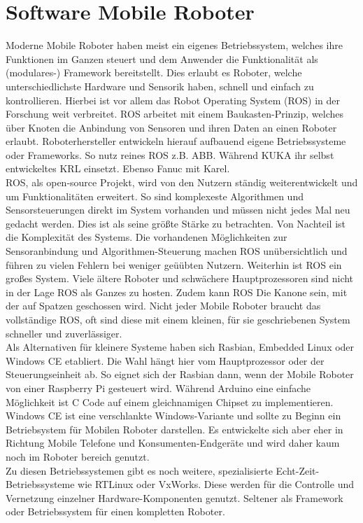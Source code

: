 \documentclass[a4paper,cleardoubleempty,BCOR1cm]{book}
\begin{document}
\section{Software Mobile Roboter}
Moderne Mobile Roboter haben meist ein eigenes Betriebssystem, welches ihre Funktionen im Ganzen steuert und dem Anwender die Funktionalität als (modulares-) Framework bereitstellt. Dies erlaubt es Roboter, welche unterschiedlichste Hardware und Sensorik haben, schnell und einfach zu kontrollieren. Hierbei ist vor allem das Robot Operating System (ROS) in der Forschung weit verbreitet. ROS arbeitet mit einem Baukasten-Prinzip, welches über Knoten die Anbindung von Sensoren und ihren Daten an einen Roboter erlaubt. Roboterhersteller entwickeln hierauf aufbauend eigene Betriebssysteme oder Frameworks. So nutz reines ROS z.B. ABB. Während KUKA ihr selbst entwickeltes KRL einsetzt. Ebenso Fanuc mit Karel. \\
ROS, als open-source Projekt, wird von den Nutzern ständig weiterentwickelt und um Funktionalitäten erweitert. So sind komplexeste Algorithmen und Sensorsteuerungen direkt im System vorhanden und müssen nicht jedes Mal neu gedacht werden. Dies ist als seine größte Stärke zu betrachten. Von Nachteil ist die Komplexität des Systems. Die vorhandenen Möglichkeiten zur Sensoranbindung und Algorithmen-Steuerung machen ROS unübersichtlich und führen zu vielen Fehlern bei weniger geüübten Nutzern. Weiterhin ist ROS ein großes System. Viele ältere Roboter und schwächere Hauptprozessoren sind nicht in der Lage ROS als Ganzes zu hosten. Zudem kann ROS Die Kanone sein, mit der auf Spatzen geschossen wird. Nicht jeder Mobile Roboter braucht das vollständige ROS, oft sind diese mit einem kleinen, für sie geschriebenen System schneller und zuverlässiger. \\
Als Alternativen für kleinere Systeme haben sich Rasbian, Embedded Linux oder Windows CE etabliert. Die Wahl hängt hier vom Hauptprozessor oder der Steuerungseinheit ab. So eignet sich der Rasbian dann, wenn der Mobile Roboter von einer Raspberry Pi gesteuert wird. Während Arduino eine einfache Möglichkeit ist C Code auf einem gleichnamigen Chipset zu implementieren. Windows CE ist eine verschlankte Windows-Variante und sollte zu Beginn ein Betriebsystem für Mobilen Roboter darstellen. Es entwickelte sich aber eher in Richtung Mobile Telefone und Konsumenten-Endgeräte und wird daher kaum noch im Roboter bereich genutzt. \\
Zu diesen Betriebssystemen gibt es noch weitere, spezialisierte Echt-Zeit-Betriebssysteme wie RTLinux oder VxWorks. Diese werden für die Controlle und Vernetzung einzelner Hardware-Komponenten genutzt. Seltener als Framework oder Betriebssystem für einen kompletten Roboter. \\
\end{document}
